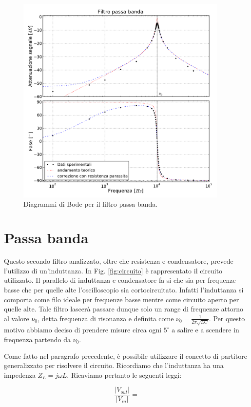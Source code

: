 \begin{figure}
    \includegraphics[width=105mm]{bpf.pdf}
    \caption{Diagrammi di Bode per il filtro passa banda.}
    \label{fig:bpf}
\end{figure}

\section{Passa banda}
Questo secondo filtro analizzato, oltre che resistenza e condensatore, prevede l'utilizzo di un'induttanza. In Fig. \ref{fig:circuito} è rappresentato il circuito utilizzato. Il parallelo di induttanza e condensatore fa si che sia per frequenze basse che per quelle alte l'oscilloscopio sia cortocircuitato. Infatti l'induttanza si comporta come filo ideale per frequenze basse mentre come circuito aperto per quelle alte. Tale filtro lascerà passare dunque solo un range di frequenze attorno al valore $\nu_0$, detta frequenza di risonanza e definita come $\nu_0=\frac{1}{2 \pi \sqrt{LC}}$. Per questo motivo abbiamo deciso di prendere misure circa ogni $5^\circ$ a salire e a scendere in frequenza partendo da $\nu_0$.

Come fatto nel paragrafo precedente, è possibile utilizzare il concetto di partitore generalizzato per risolvere il circuito. Ricordiamo che l'induttanza ha una impedenza $Z_L=j\omega L$. Ricaviamo pertanto le seguenti leggi:

\begin{equation}
\frac{|V_{out}|}{|V_{in}|}=
\label{eq:bpfGain}
\end{equation}

